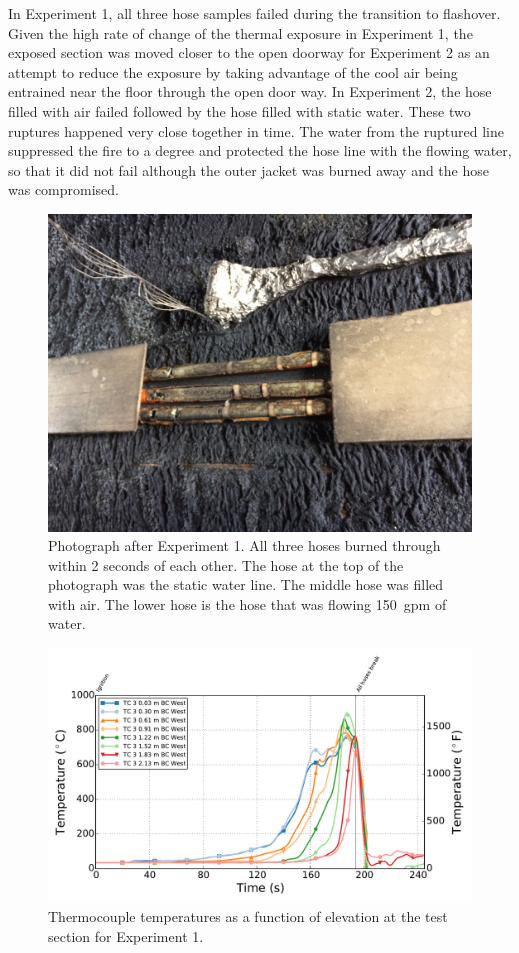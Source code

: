 \documentclass[letterpaper,11pt]{texMemo} %
\begin{document}
In Experiment 1, all three hose samples failed during the transition to flashover. Given the high rate of change of the thermal exposure in Experiment 1, the exposed section was moved closer to the open doorway for Experiment 2 as an attempt to reduce the exposure by taking advantage of the cool air being entrained near the floor through the open door way. In Experiment 2, the hose filled with air failed followed by the hose filled with static water.  These two ruptures happened very close together in time. The water from the ruptured line suppressed the fire to a degree and protected the hose line with the flowing water, so that it did not fail although the outer jacket was burned away and the hose was compromised.

\begin{figure}[!ht]
\centering
\includegraphics[width=.8\columnwidth]{../Figures/Hose_Figures/hose_post_exp1}
\caption{Photograph after Experiment 1. All three hoses burned through within 2 seconds of each other. The hose at the top of the photograph was the static water line.  The middle hose was filled with air. The lower hose is the hose that was flowing 150~gpm of water.}
\label{fig:post_test1_image}
\end{figure}

\begin{figure}[!ht]
\centering
\includegraphics[width=\columnwidth]{../Figures/Hose_Figures/Test_60_West_80915_TC_A3}
\caption{Thermocouple temperatures as a function of elevation at the test section for Experiment 1.}
\label{fig:temp_A3_test60}
\end{figure}
\end{document}

